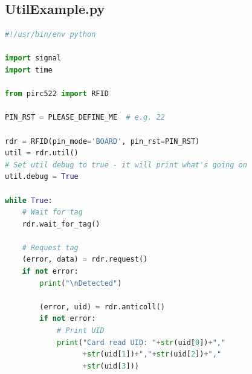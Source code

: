 \subsection{UtilExample.py}
\begin{scriptsize}
\begin{lstlisting}[style=Python, language=Python, captionpos=b, stepnumber=5, caption={UtilExample.py}, label={lst:utilExample}]
#!/usr/bin/env python

import signal
import time

from pirc522 import RFID

PIN_RST = PLEASE_DEFINE_ME  # e.g. 22

rdr = RFID(pin_mode='BOARD', pin_rst=PIN_RST)
util = rdr.util()
# Set util debug to true - it will print what's going on
util.debug = True

while True:
    # Wait for tag
    rdr.wait_for_tag()

    # Request tag
    (error, data) = rdr.request()
    if not error:
        print("\nDetected")

        (error, uid) = rdr.anticoll()
        if not error:
            # Print UID
            print("Card read UID: "+str(uid[0])+","
                  +str(uid[1])+","+str(uid[2])+","
                  +str(uid[3]))


\end{lstlisting}
\end{scriptsize}
